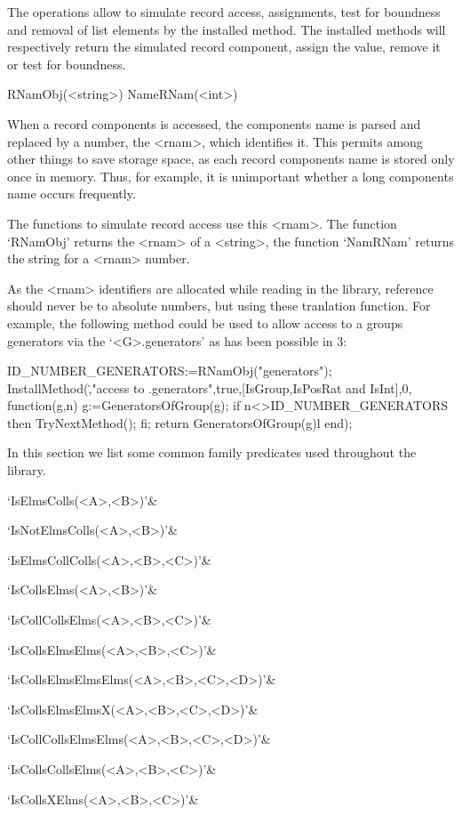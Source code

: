 The operations allow to simulate record access, assignments, test for
boundness and removal of list elements by the installed method. The 
installed methods will respectively
return the simulated record component, assign the value, remove it or test for
boundness.

\>RNamObj(<string>)
\>NameRNam(<int>)

When a record components is accessed, the components name is parsed and
replaced by a number, the <rnam>, which identifies it. This permits among
other things to
save storage space, as each record components name is stored only once in
memory. Thus, for example, it is unimportant whether a long components name
occurs frequently. 

The functions to simulate record access use this <rnam>. The function
`RNamObj' returns the <rnam> of a <string>, the function `NamRNam' returns
the string for a <rnam> number.

As the <rnam> identifiers are allocated while reading in the library,
reference should never be to absolute numbers, but using these tranlation
function. For example, the following method could be used to allow access to
a groups generators via the `<G>.generators' as has been possible in {\GAP}
3:

\beginexample
ID_NUMBER_GENERATORS:=RNamObj("generators");
InstallMethod(\.,"access to .generators",true,[IsGroup,IsPosRat and IsInt],0,
function(g,n)
  g:=GeneratorsOfGroup(g);
  if n<>ID_NUMBER_GENERATORS then
    TryNextMethod();
  fi;
  return GeneratorsOfGroup(g)l
end);
\endexample



In this section we list some common family predicates used throughout the
library.

\beginitems
`IsElmsColls(<A>,<B>)'&

`IsNotElmsColls(<A>,<B>)'&

`IsElmsCollColls(<A>,<B>,<C>)'&

`IsCollsElms(<A>,<B>)'&

`IsCollCollsElms(<A>,<B>,<C>)'&

`IsCollsElmsElms(<A>,<B>,<C>)'&

`IsCollsElmsElmsElms(<A>,<B>,<C>,<D>)'&

`IsCollsElmsElmsX(<A>,<B>,<C>,<D>)'&

`IsCollCollsElmsElms(<A>,<B>,<C>,<D>)'&

`IsCollsCollsElms(<A>,<B>,<C>)'&

`IsCollsXElms(<A>,<B>,<C>)'&

